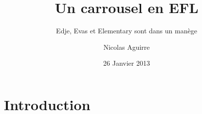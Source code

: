 \documentclass[12pt]{beamer}
\title{Un carrousel en EFL}
\subtitle{Edje, Evas et Elementary sont dans un manège}
\author{Nicolas Aguirre}
\date{26 Janvier 2013}
\begin{document}
\frame{\titlepage}

\section{Introduction}
\end{document}
